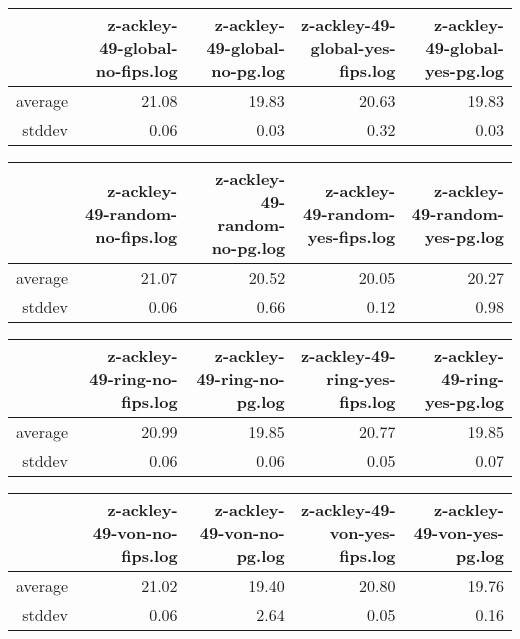 \begin{table}[ht]
\centering
\begin{tabular}{rrrrr}
  \hline
 & z-ackley-49-global-no-fips.log & z-ackley-49-global-no-pg.log & z-ackley-49-global-yes-fips.log & z-ackley-49-global-yes-pg.log \\ 
  \hline
average & 21.08 & 19.83 & 20.63 & 19.83 \\ 
  stddev & 0.06 & 0.03 & 0.32 & 0.03 \\ 
   \hline
\end{tabular}
\end{table}
\begin{table}[ht]
\centering
\begin{tabular}{rrrrr}
  \hline
 & z-ackley-49-random-no-fips.log & z-ackley-49-random-no-pg.log & z-ackley-49-random-yes-fips.log & z-ackley-49-random-yes-pg.log \\ 
  \hline
average & 21.07 & 20.52 & 20.05 & 20.27 \\ 
  stddev & 0.06 & 0.66 & 0.12 & 0.98 \\ 
   \hline
\end{tabular}
\end{table}
\begin{table}[ht]
\centering
\begin{tabular}{rrrrr}
  \hline
 & z-ackley-49-ring-no-fips.log & z-ackley-49-ring-no-pg.log & z-ackley-49-ring-yes-fips.log & z-ackley-49-ring-yes-pg.log \\ 
  \hline
average & 20.99 & 19.85 & 20.77 & 19.85 \\ 
  stddev & 0.06 & 0.06 & 0.05 & 0.07 \\ 
   \hline
\end{tabular}
\end{table}
\begin{table}[ht]
\centering
\begin{tabular}{rrrrr}
  \hline
 & z-ackley-49-von-no-fips.log & z-ackley-49-von-no-pg.log & z-ackley-49-von-yes-fips.log & z-ackley-49-von-yes-pg.log \\ 
  \hline
average & 21.02 & 19.40 & 20.80 & 19.76 \\ 
  stddev & 0.06 & 2.64 & 0.05 & 0.16 \\ 
   \hline
\end{tabular}
\end{table}
